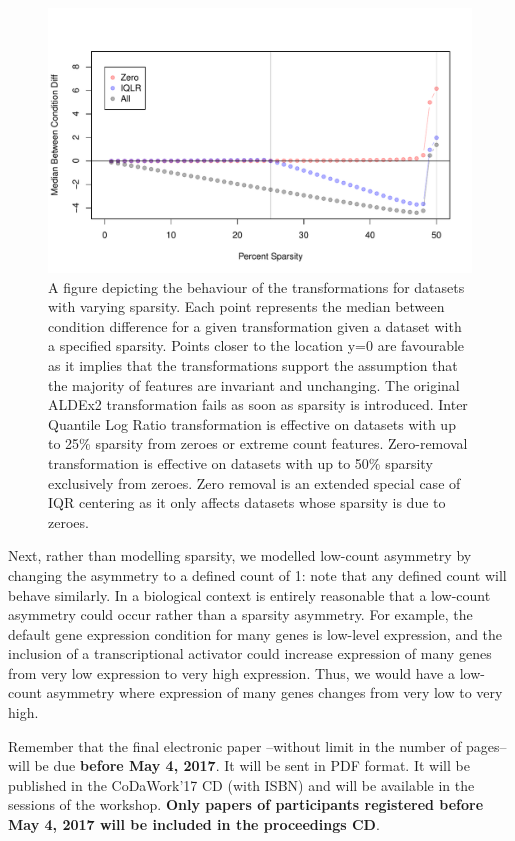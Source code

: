 \documentclass [10pt]{article}
\begin{document}
\begin{figure}[h]
\centering
\includegraphics[width=0.9\linewidth]{../figures/Fig_failure.pdf}
\caption{A figure depicting the behaviour of the transformations for datasets with varying sparsity. Each point represents the median between condition difference for a given transformation given a dataset with a specified sparsity. Points closer to the location y=0 are favourable as it implies that the transformations support the assumption that the majority of features are invariant and unchanging. The original ALDEx2 transformation fails as soon as sparsity is introduced. Inter Quantile Log Ratio transformation is effective on datasets with up to 25\% sparsity from zeroes or extreme count features. Zero-removal transformation is effective on datasets with up to 50\% sparsity exclusively from zeroes. Zero removal is an extended special case of IQR centering as it only affects datasets whose sparsity is due to zeroes.}
\label{Fig:failure_fig}
\end{figure}

Next, rather than modelling sparsity, we modelled low-count asymmetry by changing the asymmetry to a defined count of 1: note that any defined count will behave similarly. In a biological context is entirely reasonable that a low-count asymmetry could occur rather than a sparsity asymmetry. For example, the default gene expression condition for many genes is low-level expression, and the inclusion of a transcriptional activator could increase expression of many genes from very low expression to very high expression. Thus, we would have a low-count asymmetry where expression of many genes changes from very low to very high.  


Remember that the final electronic paper --without limit in the number of pages-- will be due {\bf before May 4,
2017}. It will be sent in PDF format. It will be published in the CoDaWork'17 CD (with ISBN) and will be available in
the sessions of the workshop. {\bf Only papers of participants registered before May 4, 2017 will be included in the
proceedings CD}.
\end{document}
